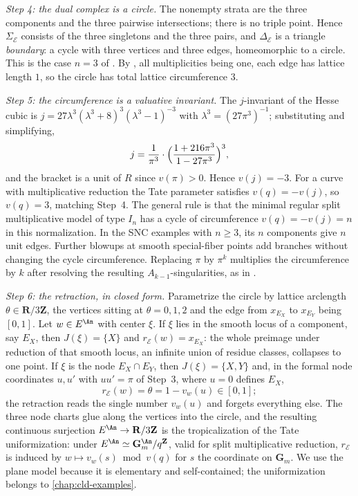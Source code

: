 \begin{example}
\emph{Step 4: the dual complex is a circle.} The nonempty strata are the
three components and the three pairwise intersections; there is no triple
point. Hence $\Sigma_{\mathcal E}$ consists of the three singletons and
the three pairs, and $\Delta_{\mathcal E}$ is a triangle \emph{boundary}:
a cycle with three vertices and three edges, homeomorphic to a circle. This
is the case $n=3$ of . By
, all multiplicities being one, each edge has
lattice length $1$, so the circle has total lattice circumference $3$.

\emph{Step 5: the circumference is a valuative invariant.} The
$j$-invariant of the Hesse cubic is
$j=27\lambda^3(\lambda^3+8)^3(\lambda^3-1)^{-3}$ with
$\lambda^3=(27\pi^3)^{-1}$; substituting and simplifying,
\[
 j=\frac1{\pi^3}\cdot
   \Bigl(\frac{1+216\pi^3}{1-27\pi^3}\Bigr)^3 ,
\]
and the bracket is a unit of $R$ since $v(\pi)>0$. Hence
$v(j)=-3$. For a curve with multiplicative reduction the Tate parameter
satisfies $v(q)=-v(j)$, so $v(q)=3$, matching Step~4. The general rule
is that the minimal regular split multiplicative model of type $I_n$ has
a cycle of circumference $v(q)=-v(j)=n$ in this normalization. In the
SNC examples with $n\ge3$, its $n$ components give $n$ unit edges.
Further blowups at smooth special-fiber points add branches without
changing the cycle circumference.
Replacing $\pi$ by $\pi^k$ multiplies the circumference by $k$ after
resolving the resulting $A_{k-1}$-singularities, as in
.

\emph{Step 6: the retraction, in closed form.} Parametrize the circle by
lattice arclength $\theta\in\mathbf R/3\mathbf Z$, the vertices sitting at
$\theta=0,1,2$ and the edge from $x_{E_X}$ to $x_{E_Y}$ being
$[0,1]$. Let $w\in E^{\An}$ with center $\xi$. If $\xi$ lies in the
smooth locus of a component, say $E_X$, then $J(\xi)=\{X\}$ and
$r_{\mathcal E}(w)=x_{E_X}$: the whole preimage under reduction of that
smooth locus, an infinite union of residue classes, collapses to one point.
If $\xi$ is the node $E_X\cap E_Y$, then $J(\xi)=\{X,Y\}$ and, in the
formal node coordinates $u,u'$ with $uu'=\pi$ of Step~3, where $u=0$
defines $E_X$,
\[
   r_{\mathcal E}(w)=\theta=1-v_w(u)\in[0,1];
\]
the retraction reads the single number $v_w(u)$ and forgets everything
else. The three node charts glue along the vertices into the circle, and the
resulting continuous surjection $E^{\An}\to\mathbf R/3\mathbf Z$ is the
tropicalization of the Tate uniformization: under
$E^{\An}\simeq\mathbf G_{m}^{\An}/q^{\mathbf Z}$, valid for split
multiplicative reduction, $r_{\mathcal E}$ is induced by
$w\mapsto v_w(s)\bmod v(q)$ for $s$ the coordinate on
$\mathbf G_m$. We use the plane model because it is elementary and
self-contained; the uniformization belongs to \cref{chap:cld-examples}.


\end{example}
